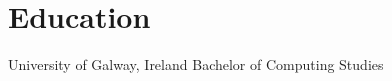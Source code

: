 \section[\faMortarBoard]{Education}
\pubforcefullwidth
{}
{University of Galway, Ireland}
{Bachelor of Computing Studies}
{}